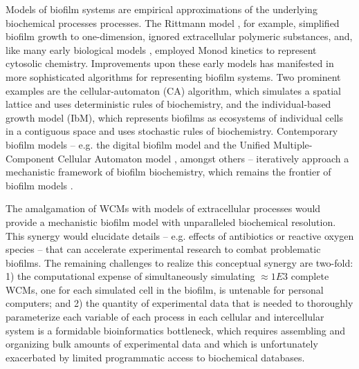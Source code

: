Models of biofilm systems are empirical approximations of the underlying biochemical processes processes\cite{Wang2010ReviewBiofilms,Lewandowski20114.15Treatment,Wanner1986AModel,Tiwari2001ModelingApplications,Tiwari1997BiofilmMedium}. The Rittmann model \cite{Suidan1987CriteriaTypes}, for example, simplified biofilm growth to one-dimension, ignored extracellular polymeric substances, and, like many early biological models \cite{Kim1989ApproximateExpression,Torres2008KineticAnode}, employed Monod kinetics to represent cytosolic chemistry. Improvements upon these early models \cite{Wanner1984CompetitionBiofilms,Gadani1993AModel} has manifested in more sophisticated algorithms for representing biofilm systems. Two prominent examples are the cellular-automaton (CA) algorithm, which simulates a spatial lattice and uses deterministic rules of biochemistry, and the individual-based growth model (IbM), which represents biofilms as ecosystems of individual cells in a contiguous space \cite{Kreft1998BacSimGrowth} and uses stochastic rules of biochemistry. Contemporary biofilm models \cite{Xavier2005Biofilm-controlStudy,DeJong2017MathematicalGrowth} -- e.g. the digital biofilm model \cite{Barai2016ModelingBehavior} and the Unified Multiple-Component Cellular Automaton model \cite{Laspidou2004EvaluatingModel}, amongst others \cite{Laspidou2014MaterialProperties,Laspidou2005FiniteBehavior} -- iteratively approach a mechanistic framework of biofilm biochemistry, which remains the frontier of biofilm models \cite{Laspidou2010Cellular-automataCons}.

The amalgamation of WCMs with models of extracellular processes \cite{Das1991AEquation,Frederick2011ACommunities,Characklis1981MicrobialAnalysis.,Waters2005QUORUMBacteria,Miller2001QuoremBacteria} would provide a mechanistic biofilm model with unparalleled biochemical resolution. This synergy would elucidate details -- e.g. effects of antibiotics \cite{Suidan1987CriteriaTypes} or reactive oxygen species \cite{Lewandowski1991ReactionBiofilms} -- that can accelerate experimental research to combat problematic biofilms. The remaining challenges to realize this conceptual synergy are two-fold: 1) the computational expense of simultaneously simulating $\approx 1E3$ complete WCMs, one for each simulated cell in the biofilm, is untenable for personal computers; and 2) the quantity of experimental data that is needed to thoroughly parameterize each variable of each process in each cellular and intercellular system is a formidable bioinformatics bottleneck, which requires assembling and organizing bulk amounts of experimental data and which is unfortunately exacerbated by limited programmatic access to biochemical databases. 


